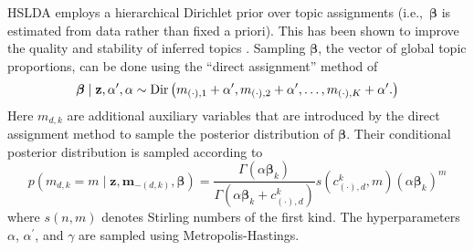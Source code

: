 %
%
%


HSLDA employs a hierarchical Dirichlet prior over topic assignments (i.e.,~$\boldsymbol\beta$ is estimated from data rather than fixed a priori).  This has been shown to improve the quality and stability of inferred topics \cite{WallachMiMc2009}. 
%
Sampling $\boldsymbol\beta$, the vector of global topic proportions,   can be done using the ``direct assignment''
method of \cite{TehJorBea2006} \begin{equation}
\boldsymbol\beta\mid\mathbf{z},\alpha^{\prime},\alpha\sim{\rm Dir}\left(m_{\left(\cdot\right),1}+\alpha^{\prime},m_{\left(\cdot\right),2}+\alpha^{\prime},\ldots,m_{\left(\cdot\right),K}+\alpha^{\prime}.\right)\end{equation}
Here $m_{d,k}$ are additional auxiliary variables that are introduced by the direct assignment method to sample the posterior distribution of $\boldsymbol\beta$.  Their conditional posterior distribution is sampled according to
 \begin{equation}
p\left(m_{d,k}=m\mid\mathbf{z},\mathbf{m}_{-\left(d,k\right)},\boldsymbol\beta\right)=\frac{\Gamma\left(\alpha\boldsymbol\beta_{k}\right)}{\Gamma\left(\alpha\boldsymbol\beta_{k}+c^k_{(\cdot),d}\right)}s\left(c^k_{(\cdot),d},m\right)\left(\alpha\boldsymbol\beta_{k}\right)^{m}\end{equation}
where $s\left(n,m\right)$ denotes Stirling numbers of the first
kind.
The hyperparameters $\alpha$, $\alpha^{\prime}$, and $\gamma$ are
sampled
using Metropolis-Hastings. \newline

